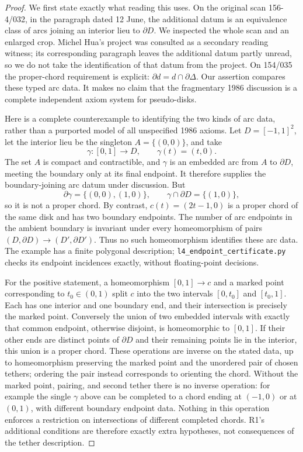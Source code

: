 \begin{proof}
We first state exactly what reading this uses. On the original scan
156-4/032, in the paragraph dated 12 June, the additional datum is an
equivalence class of arcs joining an interior lieu to $\partial D$.
We inspected the whole scan and an enlarged crop. Michel Hua's project
was consulted as a secondary reading witness; its corresponding
paragraph leaves the additional datum partly unread, so we do not
take the identification of that datum from the project. On 154/035
the proper-chord requirement is explicit:
$\partial d=d\cap\partial\Delta$. Our assertion compares these typed
arc data. It makes no claim that the fragmentary 1986 discussion is
a complete independent axiom system for pseudo-disks.

Here is a complete counterexample to identifying the two kinds of
arc data, rather than a purported model of all unspecified 1986 axioms.
Let $D=[-1,1]^2$, let the interior lieu be the singleton
$A=\{(0,0)\}$, and take
\[
 \gamma:[0,1]\longrightarrow D,\qquad\gamma(t)=(t,0).
\]
The set $A$ is compact and contractible, and $\gamma$ is an embedded
arc from $A$ to $\partial D$, meeting the boundary only at its final
endpoint. It therefore supplies the boundary-joining arc datum
under discussion. But
\[
 \partial\gamma=\{(0,0),(1,0)\},\qquad
 \gamma\cap\partial D=\{(1,0)\},
\]
so it is not a proper chord. By contrast,
$c(t)=(2t-1,0)$ is a proper chord of the same disk and has two
boundary endpoints. The number of arc endpoints in the ambient
boundary is invariant under every homeomorphism of pairs
$(D,\partial D)\to(D',\partial D')$. Thus no such homeomorphism
identifies these arc data. The example has a finite polygonal
description; \texttt{l4\_endpoint\_certificate.py} checks its endpoint
incidences exactly, without floating-point decisions.

For the positive statement, a homeomorphism $[0,1]\to c$ and a marked
point corresponding to $t_0\in(0,1)$ split $c$ into the two intervals
$[0,t_0]$ and $[t_0,1]$. Each has one interior and one boundary end,
and their intersection is precisely the marked point. Conversely the
union of two embedded intervals with exactly that common endpoint,
otherwise disjoint, is homeomorphic to $[0,1]$. If their other ends
are distinct points of $\partial D$ and their remaining points lie
in the interior, this union is a proper chord. These operations
are inverse on the stated data, up to homeomorphism preserving the
marked point and the unordered pair of chosen tethers; ordering the
pair instead corresponds to orienting the chord. Without the marked point,
pairing, and second tether there is no inverse operation: for example
the single $\gamma$ above can be completed to a chord ending at
$(-1,0)$ or at $(0,1)$, with different boundary endpoint data.
Nothing in this operation enforces a restriction on intersections
of different completed chords. R1's additional conditions are
therefore exactly extra hypotheses, not consequences of the tether
description.


\end{proof}
